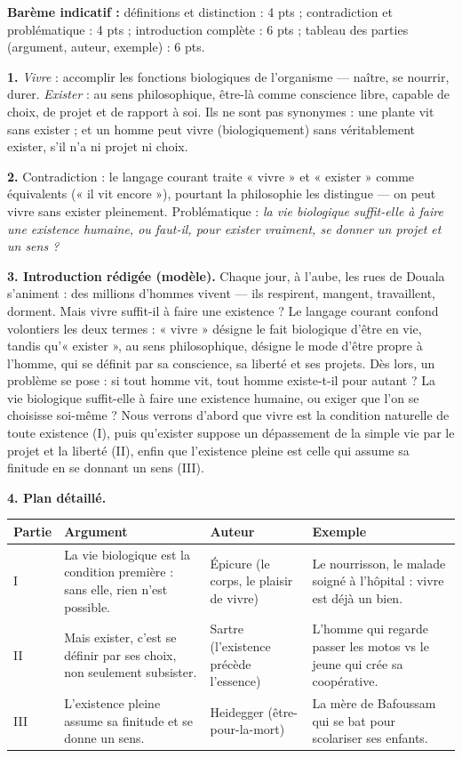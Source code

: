 \documentclass[11pt]{article}
\begin{document}
\begin{corrige}
\textbf{Barème indicatif :} définitions et distinction : 4 pts ; contradiction et problématique : 4 pts ; introduction complète : 6 pts ; tableau des parties (argument, auteur, exemple) : 6 pts.

\textbf{1.} \emph{Vivre} : accomplir les fonctions biologiques de l'organisme — naître, se nourrir, durer. \emph{Exister} : au sens philosophique, être-là comme conscience libre, capable de choix, de projet et de rapport à soi. Ils ne sont pas synonymes : une plante vit sans exister ; et un homme peut vivre (biologiquement) sans véritablement exister, s'il n'a ni projet ni choix.

\textbf{2.} Contradiction : le langage courant traite « vivre » et « exister » comme équivalents (« il vit encore »), pourtant la philosophie les distingue — on peut vivre sans exister pleinement. Problématique : \emph{la vie biologique suffit-elle à faire une existence humaine, ou faut-il, pour exister vraiment, se donner un projet et un sens ?}

\textbf{3. Introduction rédigée (modèle).} Chaque jour, à l'aube, les rues de Douala s'animent : des millions d'hommes vivent — ils respirent, mangent, travaillent, dorment. Mais vivre suffit-il à faire une existence ? Le langage courant confond volontiers les deux termes : « vivre » désigne le fait biologique d'être en vie, tandis qu'« exister », au sens philosophique, désigne le mode d'être propre à l'homme, qui se définit par sa conscience, sa liberté et ses projets. Dès lors, un problème se pose : si tout homme vit, tout homme existe-t-il pour autant ? La vie biologique suffit-elle à faire une existence humaine, ou exiger que l'on se choisisse soi-même ? Nous verrons d'abord que vivre est la condition naturelle de toute existence (I), puis qu'exister suppose un dépassement de la simple vie par le projet et la liberté (II), enfin que l'existence pleine est celle qui assume sa finitude en se donnant un sens (III).

\textbf{4. Plan détaillé.}
\begin{center}
\begin{tabularx}{\linewidth}{|l|X|X|X|}
\hline
\rowcolor{popblueL} \textbf{Partie} & \textbf{Argument} & \textbf{Auteur} & \textbf{Exemple} \\
\hline
I & La vie biologique est la condition première : sans elle, rien n'est possible. & Épicure (le corps, le plaisir de vivre) & Le nourrisson, le malade soigné à l'hôpital : vivre est déjà un bien. \\
\hline
II & Mais exister, c'est se définir par ses choix, non seulement subsister. & Sartre (l'existence précède l'essence) & L'homme qui regarde passer les motos vs le jeune qui crée sa coopérative. \\
\hline
III & L'existence pleine assume sa finitude et se donne un sens. & Heidegger (être-pour-la-mort) & La mère de Bafoussam qui se bat pour scolariser ses enfants. \\
\hline
\end{tabularx}
\end{center}


\end{corrige}
\end{document}
